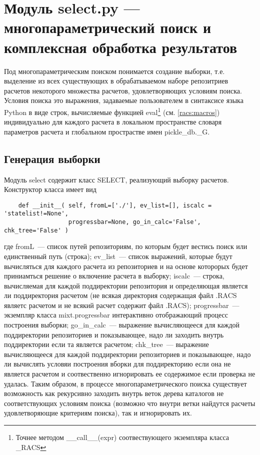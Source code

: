 \section{Модуль {\sf select.py} --- многопараметрический поиск и комплексная обработка результатов}
Под многопараметрическим поиском понимается создание выборки, т.е. выделение
из всех существующих в обрабатываемом наборе репозитриев расчетов некоторого
множества расчетов, удовлетворяющих условиям поиска. Условия поиска это
выражения, задаваемые пользователем в синтаксисе языка {\sf Python} в виде
строк, вычисляемые функцией {\sf eval}\footnote{Точнее методом {\sf
    \_\_call\_\_(expr)} соотвествующего экземпляра класса {\sf \_RACS}} (см.
\ref{racs:macros}) индивидуально для каждого расчета в локальном пространстве 
словаря параметров расчета и глобальном прострастве имен {\sf
  pickle\_db.\_G}. 

\subsection{Генерация выборки}\label{racs:mkselect:sec}
Модуль {\sf select} содержит класс {\sf SELECT}, реализующий выборку
расчетов. Конструктор класса имеет вид
\begin{verbatim}
    def __init__( self, fromL=['./'], ev_list=[], iscalc = 'statelist!=None', 
                  progressbar=None, go_in_calc='False', chk_tree='False' )
\end{verbatim}
где {\sf fromL}~--- список путей репозиториям, по которым будет вестись поиск
или единственный путь (строка); {\sf ev\_list}~--- список выражений, которые
будут вычисляться для каждого расчета из репозиториев и на основе которорых будет приниамться
решение о включение расчета в выборку; {\sf iscalc}~--- строка, вычисляемая
для каждой поддиректории репозитория и определяющая является ли поддиректория
расчетом (не всякая директория содержащая файл {\sf .RACS} являетс расчетом и
не всякий расчет содержит файл {\sf .RACS}); {\sf progressbar}~--- экземпляр
класса {\sf mixt.progressbar} интерактивно отображающий процесс построения выборки;
{\sf go\_in\_calc}~--- выражение вычисляющееся для каждой поддиректории
репозиториев и показывающее, надо ли заходить внутрь поддиректории если та
является расчетом; {\sf chk\_tree}~--- выражение вычисляющееся для каждой поддиректории
репозиториев и показывающее, надо ли вычислять условяи построения вборки для поддиректорию если она не
является расчетом и соотвественно игнорировать ее содержимое если проверка не удалась.
Таким образом, в процессе многопараметрического поиска существует возможность как рекурсивно
заходить внутрь веток дерева каталогов не соответствующих условиям поиска
(возможно что внутри ветки найдутся расчеты удовлетворяющие критериям поиска),
так и игнорировать их.

